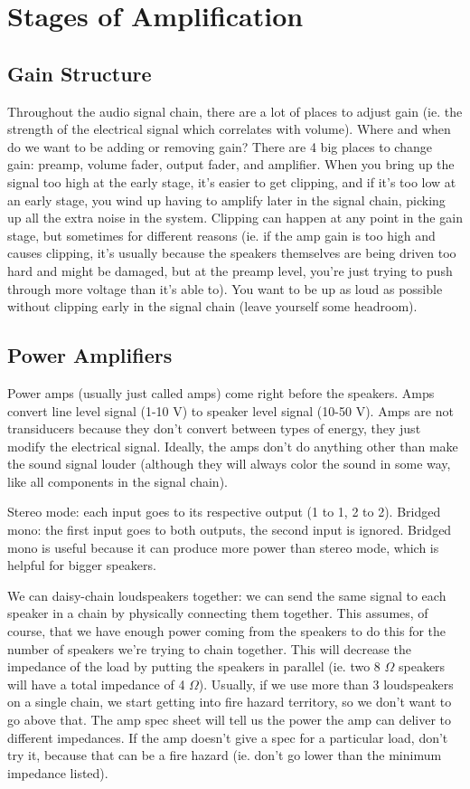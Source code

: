\documentclass[a4paper]{article}
\begin{document}
\section{Stages of Amplification}

\subsection{Gain Structure}
Throughout the audio signal chain, there are a lot of places to adjust gain
(ie. the strength of the electrical signal which correlates with volume). Where
and when do we want to be adding or removing gain? There are 4 big places to
change gain: preamp, volume fader, output fader, and amplifier. When you bring
up the signal too high at the early stage, it's easier to get clipping, and if
it's too low at an early stage, you wind up having to amplify later in the
signal chain, picking up all the extra noise in the system. Clipping can happen
at any point in the gain stage, but sometimes for different reasons (ie. if the
amp gain is too high and causes clipping, it's usually because the speakers
themselves are being driven too hard and might be damaged, but at the preamp
level, you're just trying to push through more voltage than it's able to). You
want to be up as loud as possible without clipping early in the signal chain
(leave yourself some headroom).

\subsection{Power Amplifiers}
Power amps (usually just called amps) come right before the speakers. Amps
convert line level signal (1-10 V) to speaker level signal (10-50 V). Amps are
not transiducers because they don't convert between types of energy, they just
modify the electrical signal.  Ideally, the amps don't do anything other than
make the sound signal louder (although they will always color the sound in some
way, like all components in the signal chain).

Stereo mode: each input goes to its respective output (1 to 1, 2 to 2). Bridged
mono: the first input goes to both outputs, the second input is ignored.
Bridged mono is useful because it can produce more power than stereo mode,
which is helpful for bigger speakers.

We can daisy-chain loudspeakers together: we can send the same signal to each
speaker in a chain by physically connecting them together. This assumes, of
course, that we have enough power coming from the speakers to do this for the
number of speakers we're trying to chain together. This will decrease the
impedance of the load by putting the speakers in parallel (ie. two 8 $\Omega$
speakers will have a total impedance of 4 $\Omega$). Usually, if we use more
than 3 loudspeakers on a single chain, we start getting into fire hazard
territory, so we don't want to go above that. The amp spec sheet will tell us
the power the amp can deliver to different impedances. If the amp doesn't give
a spec for a particular load, don't try it, because that can be a fire hazard
(ie. don't go lower than the minimum impedance listed).
\end{document}
